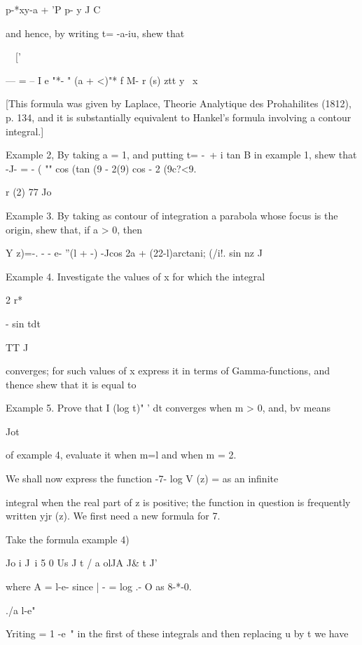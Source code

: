 p-*xy-a + 'P p- y J C

and hence, by writing t= -a-iu, shew that

\ \ ['

--- = -- I e "*- " (a + <)"* f M- r (s) ztt y \ x

[This formula was given by Laplace, Theorie Analytique des
Prohahilites (1812), p. 134, and it is substantially equivalent to
Hankel's formula involving a contour integral.]

Example 2, By taking a = 1, and putting t= -\ + i tan B in example 1,
shew that -J- = - ( "" cos (tan (9 - 2(9) cos - 2 (9c?<9.

r (2) 77 Jo

Example 3. By taking as contour of integration a parabola whose focus
is the origin, shew that, if a > 0, then

Y z)=-. - - e- ''(l + -) -Jcos 2a + (22-l)arctani; (/i!. sin nz J


Example 4. Investigate the values of x for which the integral

2 r*

 - sin tdt

TT J

converges; for such values of x express it in terms of
Gamma-functions, and thence shew that it is equal to


Example 5. Prove that I (log t)" ' dt converges when m > 0, and, bv
means

Jot

of example 4, evaluate it when m=l and when m = 2.


We shall now express the function -7- log V (z) = as an infinite

integral when the real part of z is positive; the function in
question is frequently written yjr (z). We first need a new formula
for 7.

Take the formula  example 4)

  Jo i J\ i 5 0 Us J t / a olJA J\& t J'

where A = l-e- since | - = log .- O as 8-*-0.

./a l-e"

 Yriting = 1 -e~" in the first of these integrals and then replacing u
by t we have


